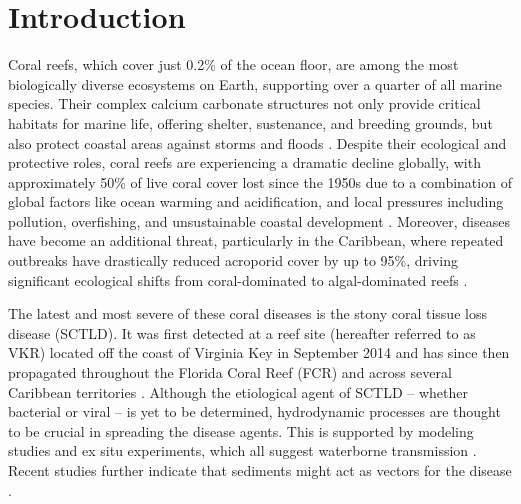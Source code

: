 \documentclass[preprint,12pt,authoryear]{elsarticle}
\begin{document}
\linenumbers

\section{Introduction}

Coral reefs, which cover just 0.2\% of the ocean floor, are among the most biologically diverse ecosystems on Earth, supporting over a quarter of all marine species. Their complex calcium carbonate structures not only provide critical habitats for marine life, offering shelter, sustenance, and breeding grounds, but also protect coastal areas against storms and floods \citep{Moberg1999, Spalding1997, Rogers2014May, Ferrario2014, Elliff2017Jun}. Despite their ecological and protective roles, coral reefs are experiencing a dramatic decline globally, with approximately 50\% of live coral cover lost since the 1950s due to a combination of global factors like ocean warming and acidification, and local pressures including pollution, overfishing, and unsustainable coastal development \citep{Eddy2021Sep}. Moreover, diseases have become an additional threat, particularly in the Caribbean, where repeated outbreaks have drastically reduced acroporid cover by up to 95\%, driving significant ecological shifts from coral-dominated to algal-dominated reefs \citep{richardson1998coral, sutherland2004disease, aronson2001white, harvell2007coral, brandt2009dynamics}.

The latest and most severe of these coral diseases is the stony coral tissue loss disease (SCTLD). It was first detected at a reef site (hereafter referred to as VKR) located off the coast of Virginia Key in September 2014 \citep{precht2016unprecedented} and has since then propagated throughout the Florida Coral Reef (FCR) and across several Caribbean territories \citep{muller2020spatial,dobbelaere2022connecting, kramer2019map, meiling2021variable, estrada2021effects,heres2021ecological}. Although the etiological agent of SCTLD -- whether bacterial or viral -- is yet to be determined, hydrodynamic processes are thought to be crucial in spreading the disease agents. This is supported by modeling studies and ex situ experiments, which all suggest waterborne transmission \citep{aeby2019pathogenesis,dobbelaere2020coupled,eaton2021measuring, meiling2021variable}. Recent studies further indicate that sediments might act as vectors for the disease \citep{rosales2020rhodobacterales, studivan2022reef}.

\end{document}
